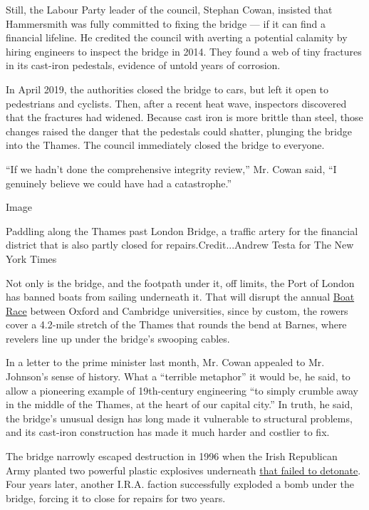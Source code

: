 Still, the Labour Party leader of the council, Stephan Cowan, insisted
that Hammersmith was fully committed to fixing the bridge --- if it can
find a financial lifeline. He credited the council with averting a
potential calamity by hiring engineers to inspect the bridge in 2014.
They found a web of tiny fractures in its cast-iron pedestals, evidence
of untold years of corrosion.

In April 2019, the authorities closed the bridge to cars, but left it
open to pedestrians and cyclists. Then, after a recent heat wave,
inspectors discovered that the fractures had widened. Because cast iron
is more brittle than steel, those changes raised the danger that the
pedestals could shatter, plunging the bridge into the Thames. The
council immediately closed the bridge to everyone.

``If we hadn't done the comprehensive integrity review,'' Mr. Cowan
said, ``I genuinely believe we could have had a catastrophe.''

Image

Paddling along the Thames past London Bridge, a traffic artery for the
financial district that is also partly closed for
repairs.Credit...Andrew Testa for The New York Times

Not only is the bridge, and the footpath under it, off limits, the Port
of London has banned boats from sailing underneath it. That will disrupt
the annual \href{https://www.theboatrace.org/}{Boat Race} between Oxford
and Cambridge universities, since by custom, the rowers cover a 4.2-mile
stretch of the Thames that rounds the bend at Barnes, where revelers
line up under the bridge's swooping cables.

In a letter to the prime minister last month, Mr. Cowan appealed to Mr.
Johnson's sense of history. What a ``terrible metaphor'' it would be, he
said, to allow a pioneering example of 19th-century engineering ``to
simply crumble away in the middle of the Thames, at the heart of our
capital city.'' In truth, he said, the bridge's unusual design has long
made it vulnerable to structural problems, and its cast-iron
construction has made it much harder and costlier to fix.

The bridge narrowly escaped destruction in 1996 when the Irish
Republican Army planted two powerful plastic explosives underneath
\href{https://www.nytimes3xbfgragh.onion/1996/04/26/world/london-bombs-were-huge-police-say.html}{that
failed to detonate}. Four years later, another I.R.A. faction
successfully exploded a bomb under the bridge, forcing it to close for
repairs for two years.

